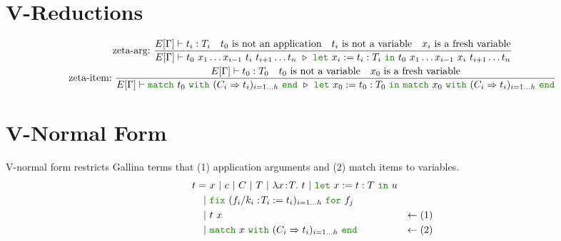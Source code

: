 \documentclass[a4paper,fleqn]{article}
\def\gallina{\textrm{Gallina}}
\newcommand{\kwlet}{\mbox{\color{mygreen}\ttfamily let}}
\newcommand{\kwin}{\mbox{\color{mygreen}\ttfamily in}}
\newcommand{\kwmatch}{\mbox{\color{mygreen}\ttfamily match}}
\newcommand{\kwwith}{\mbox{\color{mygreen}\ttfamily with}}
\newcommand{\kwend}{\mbox{\color{mygreen}\ttfamily end}}
\newcommand{\kwfix}{\mbox{\color{mygreen}\ttfamily fix}}
\newcommand{\kwfor}{\mbox{\color{mygreen}\ttfamily for}}
\newcommand{\lamT}[3]{\lambda #1\!:\!#2.~#3}
\newcommand{\letin}[3]{\kwlet~#1:=#2~\kwin~#3}
\newcommand{\match}[4]{\kwmatch~#1~\kwwith~(#2 \Rightarrow #3)_{#4}~\kwend}
\newcommand{\fixT}[5]{\kwfix~(#1:\!#2 := #3)_{#4}~\kwfor~#5}
\begin{document}
\section{V-Reductions}\label{sec:v-reductions}
\begin{gather*}
  \text{zeta-arg:}~
    \dfrac
    {
      E[\Gamma] \vdash t_i : T_i \quad
      \text{$t_0$ is not an application} \quad
      \text{$t_i$ is not a variable} \quad
      \text{$x_i$ is a fresh variable}
    }{
      E[\Gamma] \vdash
      t_0~x_1 \ldots x_{i-1}~t_i~t_{i+1} \ldots t_n
      ~\triangleright~
      \letin{x_i}{t_i:T_i}{t_0~x_1 \ldots x_{i-1}~x_i~t_{i+1} \ldots t_n}
    } \\
  \text{zeta-item:}~
    \dfrac
    {
      E[\Gamma] \vdash t_0 : T_0 \quad
      \text{$t_0$ is not a variable} \quad
      \text{$x_0$ is a fresh variable}
    }{
      E[\Gamma] \vdash
      \match{t_0}{C_i}{t_i}{i=1\dots h}
      ~\triangleright~
      \letin{x_0}{t_0:T_0}{\match{x_0}{C_i}{t_i}{i=1\dots h}}
    }
\end{gather*}

\section{V-Normal Form}\label{sec:v-normal-form}
V-normal form restricts \gallina{} terms that (1) application arguments and (2) match items to variables.
\begin{align*}
  t =&\ x~|~c~|~C~|~T~|~\lamT{x}{T}{t}~|~ \letin{x}{t:T}{u} \\
    |&\ \fixT{f_i/k_i}{T_i}{t_i}{i=1\dots h}{f_j} \\
    |&\ t~x                               & \leftarrow (1) \\
    |&\ \match{x}{C_i}{t_i}{i=1\dots h} & \leftarrow (2)
\end{align*}
\end{document}
